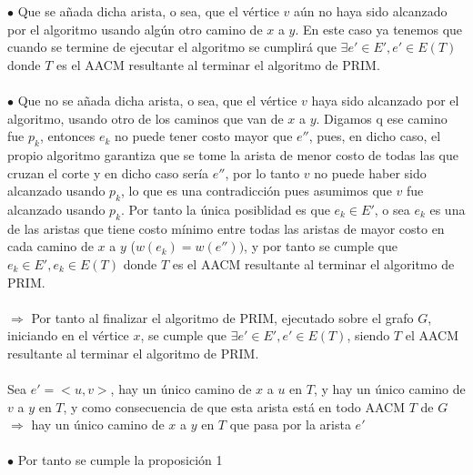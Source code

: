 \documentclass{article}
\begin{document}
    $\bullet$ Que se a\~nada dicha arista, o sea, que el v\'ertice $v$ a\'un no haya sido alcanzado por el algoritmo usando alg\'un otro camino de $x$ a $y$. En este caso ya tenemos que cuando 
    se termine de ejecutar el algoritmo se cumplir\'a que $\exists e' \in E', e' \in E(T)$ donde $T$ es el AACM resultante al terminar el algoritmo de PRIM.\\\\

    $\bullet$ Que no se a\~nada dicha arista, o sea, que el v\'ertice $v$ haya sido alcanzado por el algoritmo, usando otro de los caminos que van de $x$ a $y$.
    Digamos q ese camino fue $p_k$, entonces $e_k$ no puede tener costo mayor que $e''$, pues, en dicho caso, el propio algoritmo garantiza que se tome la arista de menor costo
    de todas las que cruzan el corte y en dicho caso ser\'ia $e''$, por lo tanto $v$ no puede haber sido alcanzado usando $p_k$, lo que es una contradicci\'on pues asumimos que $v$
    fue alcanzado usando $p_k$. Por tanto la \'unica posiblidad es que $e_k \in E'$, o sea $e_k$ es una de las aristas que tiene costo m\'inimo entre todas las aristas
    de mayor costo en cada camino de $x$ a $y$ ($w(e_k) = w(e''))$, y por tanto se cumple que $e_k \in E', e_k \in E(T)$ donde $T$ es el AACM resultante al terminar el algoritmo de PRIM.\\\\

    $\Rightarrow$ Por tanto al finalizar el algoritmo de PRIM, ejecutado sobre  el grafo $G$, iniciando en el v\'ertice $x$, se cumple que 
    $\exists e' \in E', e' \in E(T)$, siendo $T$ el AACM resultante al terminar el algoritmo de PRIM.\\\\

    Sea $e' = <u,v>$, hay un \'unico camino de $x$ a $u$ en $T$, y hay un \'unico camino de $v$ a $y$ en $T$, y como consecuencia de que esta arista est\'a en todo AACM $T$ de $G$
    $\Rightarrow$ hay un \'unico camino de $x$ a $y$ en $T$ que pasa por la arista $e'$\\\\

    $\bullet$ Por tanto se cumple la proposici\'on 1\\\\
\end{document}
